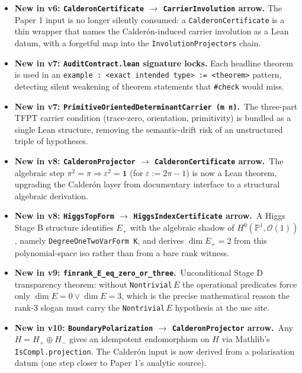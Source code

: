 \documentclass[11pt,a4paper]{article}
\begin{document}
\begin{itemize}[leftmargin=1.6em, itemsep=2pt]
    structural predicates and non-triviality.
\item \textbf{New in v6: \texttt{CalderonCertificate} $\to$
    \texttt{CarrierInvolution} arrow.} The Paper 1 input is no
    longer silently consumed: a \texttt{CalderonCertificate} is
    a thin wrapper that names the Calder\'on-induced carrier
    involution as a Lean datum, with a forgetful map into the
    \texttt{InvolutionProjectors} chain.
\item \textbf{New in v7: \texttt{AuditContract.lean} signature
    locks.} Each headline theorem is used in an
    \texttt{example : <exact intended type> := <theorem>}
    pattern, detecting silent weakening of theorem statements
    that \texttt{\#check} would miss.
\item \textbf{New in v7:
    \texttt{PrimitiveOrientedDeterminantCarrier (m n)}.}\ The
    three-part TFPT carrier condition (trace-zero, orientation,
    primitivity) is bundled as a single Lean structure, removing
    the semantic-drift risk of an unstructured triple of
    hypotheses.
\item \textbf{New in v8: \texttt{CalderonProjector} $\to$
    \texttt{CalderonCertificate} arrow.}\ The algebraic step
    $\pi^2 = \pi \Rightarrow \varepsilon^2 = \mathbf 1$ (for
    $\varepsilon := 2\pi - 1$) is now a Lean theorem, upgrading
    the Calder\'on layer from documentary interface to a
    structural algebraic derivation.
\item \textbf{New in v8: \texttt{HiggsTopForm} $\to$
    \texttt{HiggsIndexCertificate} arrow.}\ A Higgs Stage B
    structure identifies $E_+$ with the algebraic shadow of
    $H^0(\mathbb P^1, \mathcal O(1))$, namely
    \texttt{DegreeOneTwoVarForm K}, and derives $\dim E_+ = 2$
    from this polynomial-space iso rather than from a bare
    rank witness.
\item \textbf{New in v9: \texttt{finrank\_E\_eq\_zero\_or\_three}.}\
    Unconditional Stage D transparency theorem: without
    \texttt{Nontrivial}\,$E$ the operational predicates force
    only $\dim E = 0 \lor \dim E = 3$, which is the precise
    mathematical reason the rank-3 slogan must carry the
    \texttt{Nontrivial}\,$E$ hypothesis at the use site.
\item \textbf{New in v10: \texttt{BoundaryPolarization} $\to$
    \texttt{CalderonProjector} arrow.}\ Any $H = H_+ \oplus H_-$
    gives an idempotent endomorphism on $H$ via Mathlib's
    \texttt{IsCompl.projection}. The Calder\'on input is now
    derived from a polarisation datum (one step closer to
    Paper 1's analytic source).

\end{itemize}
\end{document}

